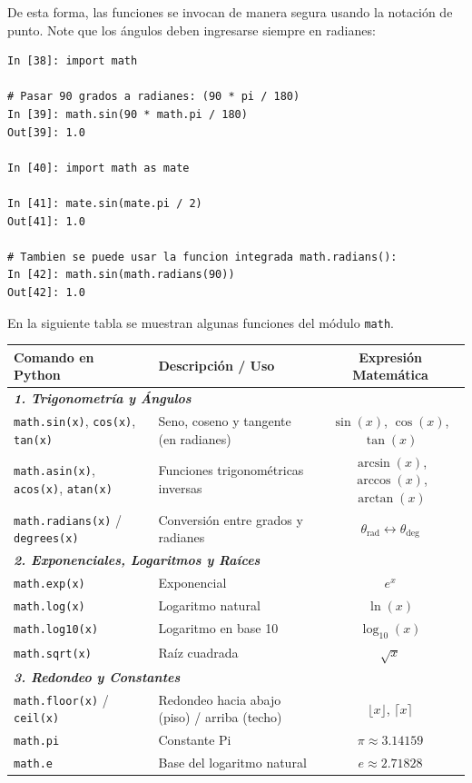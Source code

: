 \documentclass[12pt]{article}
\begin{document}
De esta forma, las funciones se invocan de manera segura usando la notación de punto. 
Note que los ángulos deben ingresarse siempre en radianes:

\begin{lstlisting}
In [38]: import math

# Pasar 90 grados a radianes: (90 * pi / 180)
In [39]: math.sin(90 * math.pi / 180)
Out[39]: 1.0

In [40]: import math as mate

In [41]: mate.sin(mate.pi / 2)
Out[41]: 1.0

# Tambien se puede usar la funcion integrada math.radians():
In [42]: math.sin(math.radians(90))
Out[42]: 1.0
\end{lstlisting}

En la siguiente tabla se muestran algunas funciones del módulo \texttt{math}. 

\begin{table}[h!]
\centering
\small
\begin{tabular}{l l c}
\toprule
\textbf{Comando en Python} & \textbf{Descripción / Uso} & \textbf{Expresión Matemática} \\
\midrule

\multicolumn{3}{l}{\textbf{\textit{1. Trigonometría y Ángulos}}} \\
\texttt{math.sin(x)}, \texttt{cos(x)}, \texttt{tan(x)} & Seno, coseno y tangente (en radianes) & $\sin(x)$, $\cos(x)$, $\tan(x)$ \\
\texttt{math.asin(x)}, \texttt{acos(x)}, \texttt{atan(x)} & Funciones trigonométricas inversas & $\arcsin(x)$, $\arccos(x)$, $\arctan(x)$ \\
\texttt{math.radians(x)} / \texttt{degrees(x)} & Conversión entre grados y radianes & $\theta_{\text{rad}} \leftrightarrow \theta_{\text{deg}}$ \\

\midrule
\multicolumn{3}{l}{\textbf{\textit{2. Exponenciales, Logaritmos y Raíces}}} \\
\texttt{math.exp(x)} & Exponencial & $e^x$ \\
\texttt{math.log(x)} & Logaritmo natural & $\ln(x)$ \\
\texttt{math.log10(x)} & Logaritmo en base 10 & $\log_{10}(x)$ \\
\texttt{math.sqrt(x)} & Raíz cuadrada & $\sqrt{x}$ \\

\midrule
\multicolumn{3}{l}{\textbf{\textit{3. Redondeo y Constantes}}} \\
\texttt{math.floor(x)} / \texttt{ceil(x)} & Redondeo hacia abajo (piso) / arriba (techo) & $\lfloor x \rfloor$, $\lceil x \rceil$ \\
\texttt{math.pi} & Constante Pi & $\pi \approx 3.14159$ \\
\texttt{math.e} & Base del logaritmo natural & $e \approx 2.71828$ \\

\bottomrule
\end{tabular}
\end{table}
\end{document}

